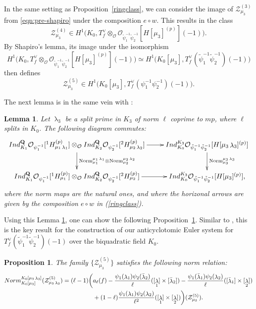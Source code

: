 \documentclass[10pt,letterpaper]{amsart}
\theoremstyle{plain}
\theoremstyle{definition}
\theoremstyle{definition}
\theoremstyle{plain}
\newtheorem{prop}[thm]{Proposition}
\theoremstyle{plain}
\newtheorem{lem}[thm]{Lemma}
\theoremstyle{plain}
\theoremstyle{remark}
\numberwithin{equation}{section}
\DeclareMathOperator{\la}{\lambda}
\newcommand{\Q}{\mathbf{Q}}
\begin{document}
In the same setting as Proposition~\ref{ringclass}, we can consider the image of $\mathcal{Z}_{\mu_3}^{(3)}$ from \ref{eqn:pre-shapiro} under the composition $e\circ w$. This results in the class 
\[
\mathcal{Z}_{\mu_3}^{(4)}\in  H^1\bigl(K_0,T_f^{\vee}\otimes_{\mathcal{O}}\mathcal{O}_{\tilde{\psi}_1^{-1}\tilde{\psi}_2^{-1}}[H[\mu_3]^{(p)}](-1)\bigr).
\]
By Shapiro's lemma, its image under the isomorphism 
\[H^1\bigl(K_0,T_f^{\vee}\otimes_{\mathcal{O}}\mathcal{O}_{\tilde{\psi}_1^{-1}\tilde{\psi}_2^{-1}}[H[\mu_3]^{(p)}](-1)\bigr)\simeq H^1\bigl(K_0[\mu_3],T_f^{\vee}(\tilde{\psi}_{1}^{-1}\tilde{\psi}_{2}^{-1})(-1)\bigr)
\]
then defines
\[
\mathcal{Z}_{\mu_3}^{(5)}\in H^1\bigl(K_0[\mu_3],T_f^{\vee}(\psi_{1}^{-1}\psi_{2}^{-1})(-1)\bigr).
\]



The next lemma is in the same vein with \cite[Lem.\,2.1.3]{CD}:
\begin{lem}\label{keydiagram}
Let $\la_3$ be a split prime in $K_3$ of norm $\ell$ coprime to $mp$, where $\ell$ splits in $K_0$. The following diagram commutes:
\[
\xymatrix{
 {\rm Ind}^{\Q}_{K_1}\mathcal{O}_{\psi_{1}^{-1}}[^{1}H_{\mu_1\la_1}^{(p)}]\otimes_{\mathcal{O}}{\rm Ind}^{\Q}_{K_2}\mathcal{O}_{\psi_{2}^{-1}}[^{2}H_{\mu_2\la_2}^{(p)}] \ar[d]^{\mathrm{Norm}^{\mu_1\la_1}_{\mu_1}\otimes\mathrm{Norm}^{\mu_2\la_2}_{\mu_2}} \ar[r] &{\rm Ind}^{K_3}_{K_0}\mathcal{O}_{\tilde{\psi}_{1}^{-1}\tilde{\psi}_{2}^{-1}}[H[\mu_3\la_3]^{(p)}] \ar[d]^{\mathrm{Norm}^{\mu_3\la_3}_{\mu_3}} \\
{\rm Ind}^{\Q}_{K_1}\mathcal{O}_{\psi_{1}^{-1}}[^{1}H_{\mu_1}^{(p)}]\otimes_{\mathcal{O}}{\rm Ind}^{\Q}_{K_2}\mathcal{O}_{\psi_{2}^{-1}}[^{2}H_{\mu_2}^{(p)}] \ar[r] & {\rm Ind}^{K_3}_{K_0}\mathcal{O}_{\tilde{\psi}_{1}^{-1}\tilde{\psi}_{2}^{-1}}[H[\mu_3]^{(p)}],}
\]
where the norm maps are the natural ones, and where the horizonal arrows are given by the composition $e\circ w$ in  (\ref{ringclass}).
\end{lem}

Using this Lemma \ref{keydiagram}, one can show the following Proposition~\ref{wrongnorm}. Similar to \cite[Prop ${2.2.1}$]{CD}, this is the key result for the construction of our anticyclotomic Euler system for $T_f^\vee(\tilde{\psi}_1^{-1}\tilde{\psi}_2^{-1})(-1)$ over the biquadratic field $K_0$. 



\begin{prop}\label{wrongnorm}
The family $\{\mathcal{Z}_{\mu_3}^{(5)}\}$ satisfies the following norm relation:
\begin{align*}
{\rm Norm}_{K_0[\mu_3]}^{K_0[\mu_3\la_3]}(\mathcal{Z}_{\mu_3\la_3}^{(5)})=(\ell-1)\bigg(&a_\ell(f)-\frac{\psi_1(\la_1)\psi_2(\bar{\la}_2)}{\ell}([\la_1]\times [\bar{\la}_2])-\frac{\psi_1(\bar{\la}_1)\psi_2(\la_2)}{\ell}([\bar{\la}_1]\times [\la_2])\\
   &+(1-\ell)\frac{\psi_1(\la_1)\psi_2(\la_2)}{\ell^2}([\la_1]\times[\la_2])\bigg)
    (\mathcal{Z}_{\mu_3}^{(5)}).
\end{align*}
\end{prop}
\end{document}
